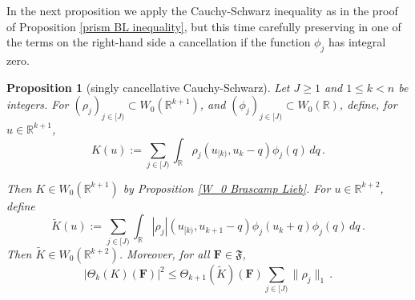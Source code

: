 \documentclass[12pt,reqno]{amsart}
\theoremstyle{plain}
\newtheorem{proposition}[theorem]{Proposition}
\numberwithin{equation}{section}
\theoremstyle{remark}
\newcommand{\using}[1]{}
\newcommand{\R}{{\mathbb R}}
\newcommand{\F}{\mathbf{F}}
\begin{document}
In the next proposition we apply the Cauchy-Schwarz inequality as in the proof of Proposition \ref{prism BL inequality}, but this time carefully preserving in one of the terms on the right-hand side
a cancellation if the function $\phi_j$ has integral zero.


\begin{proposition}[singly cancellative Cauchy-Schwarz]\label{single cancellative Cauchy-Schwarz}\using{cube BL inequality}
Let $J\ge 1$ and $1\le k<n$ be integers. For
$(\rho_j)_{j\in [J)}\subset W_0(\R^{k+1})$, and
$(\phi_j)_{j\in [J)}\subset W_0(\R)$, define, for $u\in \R^{k+1}$,
\begin{equation}\label{auto:Cauchy-Schwarz-kernel-K}
    K(u):=\sum_{j\in[J)}\int_\R \rho_j(u_{[k)},u_k-q)\phi_j(q)\,dq\,.
\end{equation}

Then $K\in W_0(\R^{k+1})$ by Proposition \ref{W_0 Brascamp Lieb}.
For $u\in \R^{k+2}$, define
\begin{equation}\label{auto:Cauchy-Schwarz-kernel-tilde-K}
    \tilde{K}(u):=\sum_{j\in[J)}\int_\R
    |\rho_j|(u_{[k)},u_{k+1}-q)\phi_j(u_k+q)\phi_j(q)\,dq\, .
\end{equation}
Then $\tilde{K}\in W_0(\R^{k+2})$.
Moreover, for all $\F\in\mathfrak{F}$,
\begin{equation}\label{auto:Cauchy-Schwarz-at-k-bound}
    |\Theta_k(K)(\F)|^2
    \le \Theta_{k+1}(\tilde{K})(\F)\sum_{j\in[J)}\|\rho_j\|_1\, .
\end{equation}
\end{proposition}
\end{document}
